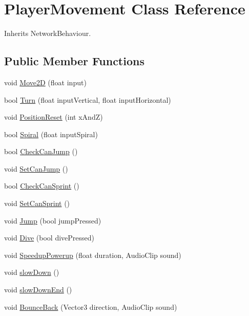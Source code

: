 \hypertarget{class_player_movement}{}\section{Player\+Movement Class Reference}
\label{class_player_movement}


Inherits Network\+Behaviour.

\subsection*{Public Member Functions}
\begin{DoxyCompactItemize}
\item 
void \hyperlink{class_player_movement_a14a6dd3ffa26d0ccbf484448b5266b79}{Move2D} (float input)
\item 
bool \hyperlink{class_player_movement_a32c7ec914f2b18dfcf6e9c354f6e2f8e}{Turn} (float input\+Vertical, float input\+Horizontal)
\item 
void \hyperlink{class_player_movement_a0f28741d3452090520ee11352140aed0}{Position\+Reset} (int x\+AndZ)
\item 
bool \hyperlink{class_player_movement_a02c0e10fc29c38c92c6196d70364ac89}{Spiral} (float input\+Spiral)
\item 
bool \hyperlink{class_player_movement_a14c78137af78e9cc16246804a42b90a7}{Check\+Can\+Jump} ()
\item 
void \hyperlink{class_player_movement_af704bd9f7ca1cda2ba100a8ef631dbc9}{Set\+Can\+Jump} ()
\item 
bool \hyperlink{class_player_movement_aff95a78e48e00b3196b7ec14c77539e2}{Check\+Can\+Sprint} ()
\item 
void \hyperlink{class_player_movement_a6eca87a71348040e0eedb138eb1c3a0c}{Set\+Can\+Sprint} ()
\item 
void \hyperlink{class_player_movement_ae0738f125df9382e2425be64619cbf4a}{Jump} (bool jump\+Pressed)
\item 
void \hyperlink{class_player_movement_a17f581958c3a8d8bf6f230117ce79a4e}{Dive} (bool dive\+Pressed)
\item 
void \hyperlink{class_player_movement_a9d75c39b5e4ee0c5d999bdfdc4d1db73}{Speedup\+Powerup} (float duration, Audio\+Clip sound)
\item 
void \hyperlink{class_player_movement_a688ef83dd4792fdb5bcf76195b7f2fae}{slow\+Down} ()
\item 
void \hyperlink{class_player_movement_a323e163d04bd2b048ca8d17510cfe299}{slow\+Down\+End} ()
\item 
void \hyperlink{class_player_movement_afb1de7cf992b55d0dc16fa0f39cec433}{Bounce\+Back} (Vector3 direction, Audio\+Clip sound)
\end{DoxyCompactItemize}
